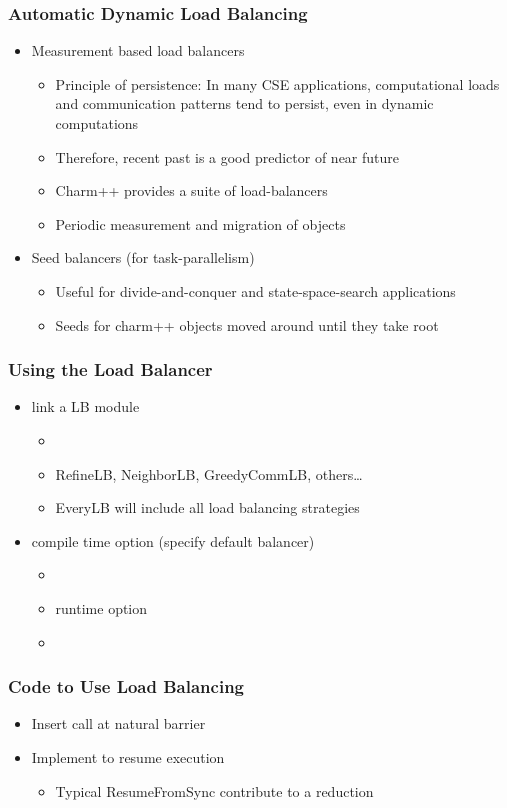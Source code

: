 \begin{frame}[fragile]
\frametitle{Automatic Dynamic Load Balancing}
\begin{itemize}
\item Measurement based load balancers
\begin{itemize}
\item Principle of persistence: In many CSE applications, computational loads and communication patterns tend to persist, even in dynamic computations
\item Therefore, recent past is a good predictor of near future
\item Charm++ provides a suite of load-balancers 
\item Periodic measurement and migration of objects
\end{itemize}
\item Seed balancers (for task-parallelism)
\begin{itemize}
\item Useful for divide-and-conquer and state-space-search applications
\item Seeds for charm++ objects moved around until they take root
\end{itemize}
\end{itemize}
\end{frame}

\begin{frame}[fragile]
\frametitle{Using the Load Balancer}
\begin{itemize}
\item link a LB module 
\begin{itemize}
\item {}
\item RefineLB, NeighborLB, GreedyCommLB, others…
\item EveryLB will include all load balancing strategies
\end{itemize}
\item compile time option (specify default balancer)
\begin{itemize}
\item {}
\item runtime option
\item {}
\end{itemize}
\end{itemize}
\end{frame}

\begin{frame}
\frametitle{Code to Use Load Balancing}
\begin{itemize}
\item Insert  call at natural barrier
\item Implement  to resume execution
\begin{itemize}
\item Typical ResumeFromSync contribute to a reduction
\end{itemize}
\end{itemize}
\end{frame}


